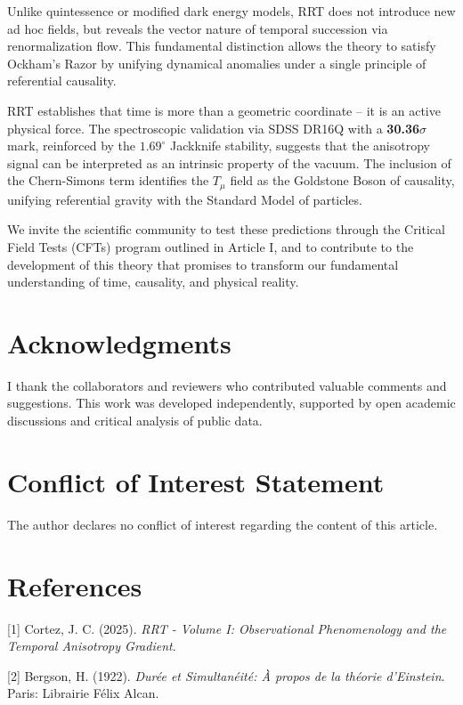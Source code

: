 \documentclass[10pt, a4paper]{article}
\begin{document}
\vspace{0.3cm} 
Unlike quintessence or modified dark energy models, RRT does not introduce new ad hoc fields, but reveals the vector nature of temporal succession via renormalization flow. This fundamental distinction allows the theory to satisfy Ockham's Razor by unifying dynamical anomalies under a single principle of referential causality.
\vspace{0.3cm}

RRT establishes that time is more than a geometric coordinate – it is an active physical force. The spectroscopic validation via SDSS DR16Q with a \textbf{30.36$\sigma$} mark, reinforced by the $1.69^\circ$ Jackknife stability, suggests that the anisotropy signal can be interpreted as an intrinsic property of the vacuum. The inclusion of the Chern-Simons term identifies the $T_\mu$ field as the Goldstone Boson of causality, unifying referential gravity with the Standard Model of particles.

We invite the scientific community to test these predictions through the Critical Field Tests (CFTs) program outlined in Article I, and to contribute to the development of this theory that promises to transform our fundamental understanding of time, causality, and physical reality.

\section*{Acknowledgments}

I thank the collaborators and reviewers who contributed valuable comments and suggestions. This work was developed independently, supported by open academic discussions and critical analysis of public data.

\section*{Conflict of Interest Statement}

The author declares no conflict of interest regarding the content of this article.

\section*{References}

[1] Cortez, J. C. (2025). \textit{RRT - Volume I: Observational Phenomenology and the Temporal Anisotropy Gradient}.

[2] Bergson, H. (1922). \textit{Durée et Simultanéité: À propos de la théorie d'Einstein}. Paris: Librairie Félix Alcan.
\end{document}
